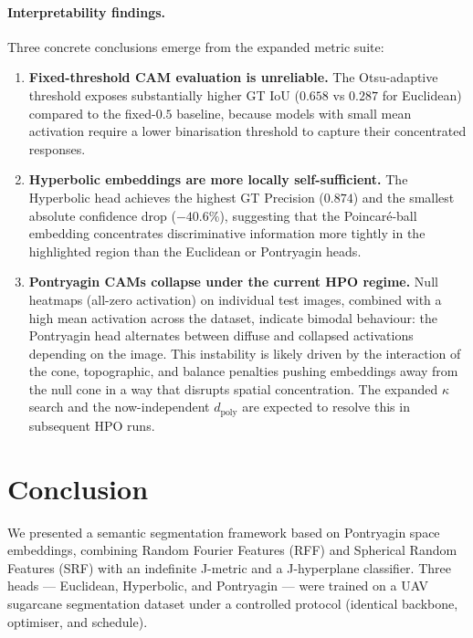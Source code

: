 \documentclass[12pt,a4paper]{article}
\newcommand{\kap}{\kappa}
\newcommand{\dpoly}{d_{\mathrm{poly}}}
\theoremstyle{definition}
\begin{document}
\paragraph{Interpretability findings.}
Three concrete conclusions emerge from the expanded metric suite:

\begin{enumerate}[noitemsep]
  \item \textbf{Fixed-threshold CAM evaluation is unreliable.}
        The Otsu-adaptive threshold exposes substantially higher GT IoU
        ($0.658$ vs $0.287$ for Euclidean) compared to the fixed-$0.5$
        baseline, because models with small mean activation require a
        lower binarisation threshold to capture their concentrated responses.

  \item \textbf{Hyperbolic embeddings are more locally self-sufficient.}
        The Hyperbolic head achieves the highest GT Precision ($0.874$) and
        the smallest absolute confidence drop ($-40.6\%$), suggesting that
        the Poincaré-ball embedding concentrates discriminative information
        more tightly in the highlighted region than the Euclidean or
        Pontryagin heads.

  \item \textbf{Pontryagin CAMs collapse under the current HPO regime.}
        Null heatmaps (all-zero activation) on individual test images, combined
        with a high mean activation across the dataset, indicate bimodal
        behaviour: the Pontryagin head alternates between diffuse and
        collapsed activations depending on the image.  This instability is
        likely driven by the interaction of the cone, topographic, and balance
        penalties pushing embeddings away from the null cone in a way that
        disrupts spatial concentration.  The expanded $\kap$ search and the
        now-independent $\dpoly$ are expected to resolve this in subsequent
        HPO runs.
\end{enumerate}

\section{Conclusion}

We presented a semantic segmentation framework based on Pontryagin space
embeddings, combining Random Fourier Features (RFF) and Spherical Random
Features (SRF) with an indefinite J-metric and a J-hyperplane classifier.
Three heads — Euclidean, Hyperbolic, and Pontryagin — were trained on a UAV
sugarcane segmentation dataset under a controlled protocol (identical
backbone, optimiser, and schedule).
\end{document}
